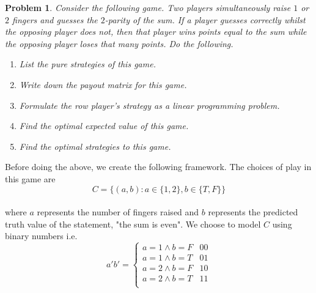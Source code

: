 \documentclass[12pt,oneside]{amsart}
\numberwithin{equation}{section}
\numberwithin{figure}{section}
\theoremstyle{plain}
\newtheorem{prob}{Problem}
\theoremstyle{definition}
\begin{document}
\begin{prob}
Consider the following game. Two players simultaneously raise $1$ or $2$ fingers 
and guesses the $2$-parity of the sum. If a player guesses correctly whilst the 
opposing player does not, then that player wins points equal to the sum while the 
opposing player loses that many points. Do the following. \\ \pagebreak
\begin{enumerate}
  \item List the pure strategies of this game. \\
  \item Write down the payout matrix for this game. \\
  \item Formulate the row player's strategy as a linear programming problem. \\
  \item Find the optimal expected value of this game. \\
  \item Find the optimal strategies to this game. \\
\end{enumerate}
\end{prob}
Before doing the above, we create the following framework. The choices of 
play in this game are \\ 
\[C = \{(a,b) : a \in \{1,2\}, b \in \{T,F\}\}\] \\
where $a$ represents the number of fingers raised and $b$ represents the 
predicted truth value of the statement, "the sum is even". We choose to model $C$ 
using binary numbers i.e. \\
\[a'b' = \begin{cases}
  a = 1 \land b = F & 00 \\
  a = 1 \land b = T & 01 \\
  a = 2 \land b = F & 10 \\
  a = 2 \land b = T & 11 \\
\end{cases}\] \\
\end{document}
